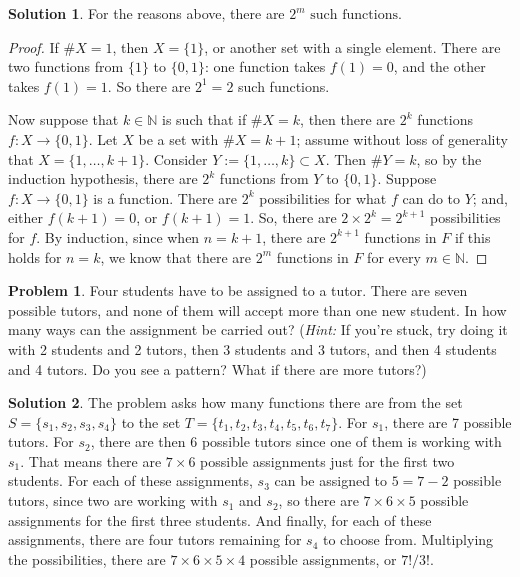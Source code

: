 \documentclass{article}
\numberwithin{equation}{section}
\theoremstyle{plain}
\theoremstyle{definition}
\newtheorem{problem}{Problem}
\newtheorem*{solution*}{Solution}
\newcommand{\N}{\mathbb N}
\begin{document}
\begin{solution*}
	For the reasons above, there are $\boxed{2^m \textrm{ such functions.}}$
	
	\begin{proof}
		If $\#X = 1$, then $X = \{1\}$, or another set with a single element. There are two functions from $\{1\}$ to $\{0,1\}$: one function takes $f(1) = 0$, and the other takes $f(1) = 1$. So there are $2^1 = 2$ such functions. 
		
		Now suppose that $k \in \N$ is such that if $\#X = k$, then there are $2^k$ functions $f : X \to \{0,1\}$. Let $X$ be a set with $\#X = k+1$; assume without loss of generality that $X = \{1, \ldots, k+1\}$. Consider $Y := \{1, \ldots, k\} \subset X$. Then $\#Y = k$, so by the induction hypothesis, there are $2^k$ functions from $Y$ to $\{0,1\}$. Suppose $f : X \to \{0,1\}$ is a function. There are $2^k$ possibilities for what $f$ can do to $Y$; and, either $f(k+1) = 0$, or $f(k+1) = 1$. So, there are $2 \times 2^k = 2^{k+1}$ possibilities for $f$. By induction, since when $n=k+1$, there are $2^{k+1}$ functions in $F$ if this holds for $n=k$, we know that there are $2^m$ functions in $F$ for every $m \in \N$.
	\end{proof}
\end{solution*}

\begin{problem}
	Four students have to be assigned to a tutor. There are seven possible tutors, and none of them will accept more than one new student. In how many ways can the assignment be carried out? (\emph{Hint:} If you're stuck, try doing it with 2 students and 2 tutors, then 3 students and 3 tutors, and then 4 students and 4 tutors. Do you see a pattern? What if there are more tutors?)
\end{problem}

\begin{solution*}
	The problem asks how many functions there are from the set $S = \{s_1, s_2, s_3, s_4\}$ to the set $T = \{t_1, t_2, t_3, t_4, t_5, t_6, t_7\}$. For $s_1$, there are 7 possible tutors. For $s_2$, there are then 6 possible tutors since one of them is working with $s_1$. That means there are $7 \times 6$ possible assignments just for the first two students. For each of these assignments, $s_3$ can be assigned to $5 = 7-2$ possible tutors, since two are working with $s_1$ and $s_2$, so there are $7 \times 6 \times 5$ possible assignments for the first three students. And finally, for each of these assignments, there are four tutors remaining for $s_4$ to choose from. Multiplying the possibilities, there are $7 \times 6 \times 5 \times 4$ possible assignments, or $\boxed{7!/3!}$. 
\end{solution*}
\end{document}
